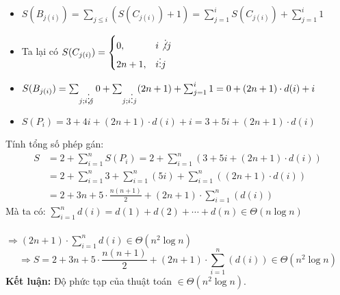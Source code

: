 \documentclass[12pt,a4paper]{article}
\begin{document}
\begin{enumerate}[label=\textbf{Câu 1:} ]
\begin{itemize}[label=$\bullet$]
          \item $S(B_{j(i)}) = \sum_{j \le i} ( S(C_{j(i)}) + 1 ) = \sum_{j = 1}^{i} S(C_{j(i)}) + \sum_{j = 1}^{i} 1$
          \item Ta lại có $S(C_{j(i)}) =
    \begin{cases}
        0, & i \not\vdots j \\
        2n+1, & i \vdots j\\
    \end{cases}$
            \item $ S(B_{j(i)}) = \sum_{j; i \not\vdots j} 0 + \sum_{j; i \vdots j} (2n+1) + \sum_{j = 1}^{i} 1 = 0 + (2n+1) \cdot d(i) + i$
            \item $S(P_i) = 3 + 4i + (2n+1) \cdot d(i) + i = 3 + 5i + (2n+1) \cdot d(i)$
          \end{itemize}
          Tính tổng số phép gán:
\[
\begin{aligned}
S &= 2 + \sum_{i = 1}^{n} S(P_i) = 2 + \sum_{i = 1}^{n}(3 + 5i + (2n+1) \cdot d(i)) \\
&= 2 + \sum_{i = 1}^{n} 3 + \sum_{i = 1}^{n}(5i) + \sum_{i = 1}^{n}((2n+1) \cdot d(i)) \\
&= 2 + 3n + 5 \cdot \frac{n(n+1)}{2} + (2n+1) \cdot \sum_{i = 1}^{n}(d(i))
\end{aligned}
\]
Mà ta có: $\sum_{i = 1}^{n}d(i) = d(1)+d(2)+\cdots+d(n) \in \Theta(n \log n)$\\ \\
$ \Rightarrow(2n+1) \cdot \sum_{i = 1}^{n}d(i) \in \Theta(n^2 \log n)$\\ 
\[\Rightarrow S = 2 + 3n + 5 \cdot \frac{n(n+1)}{2} + (2n+1) \cdot \sum_{i = 1}^{n}(d(i)) \in \Theta(n^2 \log n)\]
\textbf{Kết luận:} Độ phức tạp của thuật toán \(\in \Theta(n^2 \log n)\).
\end{enumerate}
\end{document}

